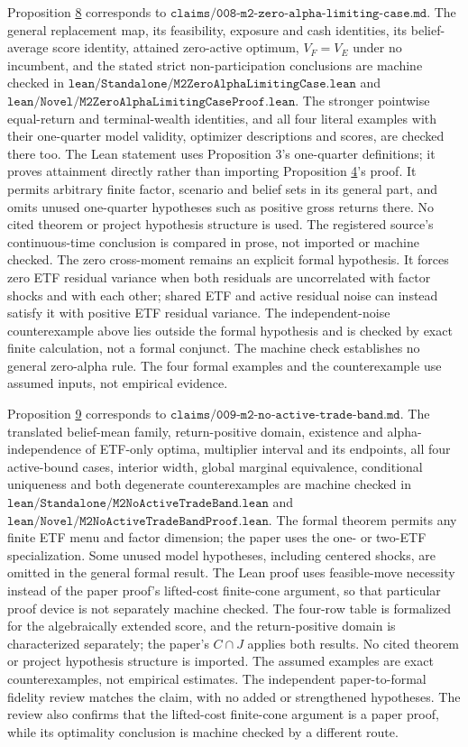 \documentclass[11pt]{article}
\begin{document}
Proposition \hyperref[res:Proposition-8]{8} corresponds to
\(\texttt{claims/008-m2-zero-alpha-limiting-case.md}\). The general
replacement map, its feasibility, exposure and cash identities, its
belief-average score identity, attained zero-active optimum,
\(V_F=V_E\) under no incumbent, and the stated strict
non-participation conclusions are machine checked in
\(\texttt{lean/Standalone/M2ZeroAlphaLimitingCase.lean}\) and
\(\texttt{lean/Novel/M2ZeroAlphaLimitingCaseProof.lean}\). The stronger
pointwise equal-return and terminal-wealth identities, and all four
literal examples with their one-quarter model validity, optimizer descriptions and
scores, are checked there too. The Lean statement uses Proposition
3's one-quarter definitions; it proves attainment directly rather than
importing Proposition \hyperref[res:Proposition-4]{4}'s proof. It permits arbitrary finite factor,
scenario and belief sets in its general part, and omits unused one-quarter
hypotheses such as positive gross returns there. No cited theorem or
project hypothesis structure is used. The registered source's
continuous-time conclusion is compared in prose, not imported or
machine checked. The zero cross-moment remains an explicit formal
hypothesis. It forces zero ETF residual variance when both
residuals are uncorrelated with factor shocks and with each other;
shared ETF and active residual noise can instead satisfy it with
positive ETF residual variance. The independent-noise
counterexample above lies outside the formal hypothesis and is
checked by exact finite calculation, not a formal conjunct.
The machine check establishes no general zero-alpha rule. The
four formal examples and the counterexample use assumed inputs,
not empirical evidence.

Proposition \hyperref[res:Proposition-9]{9} corresponds to
\(\texttt{claims/009-m2-no-active-trade-band.md}\). The translated
belief-mean family, return-positive domain, existence and
alpha-independence of ETF-only optima, multiplier interval and its
endpoints, all four active-bound cases, interior width, global
marginal equivalence, conditional uniqueness and both degenerate
counterexamples are machine checked in
\(\texttt{lean/Standalone/M2NoActiveTradeBand.lean}\) and
\(\texttt{lean/Novel/M2NoActiveTradeBandProof.lean}\).
The formal theorem permits any finite ETF menu and factor dimension;
the paper uses the one- or two-ETF specialization. Some unused model
hypotheses, including centered shocks, are omitted in the general
formal result. The Lean proof uses feasible-move necessity instead
of the paper proof's lifted-cost finite-cone argument, so that
particular proof device is not separately machine checked. The
four-row table is formalized for the algebraically extended score,
and the return-positive domain is characterized separately; the
paper's \(C\cap J\) applies both results. No cited theorem or
project hypothesis structure is imported. The assumed examples are
exact counterexamples, not empirical estimates. The independent
paper-to-formal fidelity review matches the claim, with no added or
strengthened hypotheses. The review also confirms that the
lifted-cost finite-cone argument is a paper proof, while its
optimality conclusion is machine checked by a different route.
\end{document}
